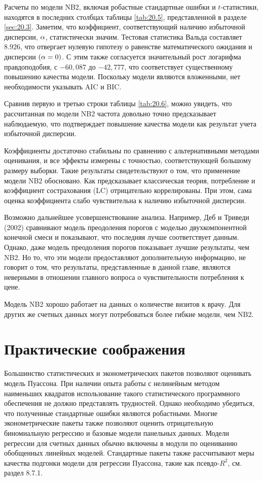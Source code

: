 Расчеты по модели NB2, включая робастные стандартные ошибки и $t$-статистики, находятся в последних столбцах таблицы \ref{tab:20.5}, представленной в разделе \ref{sec:20.3}. Заметим, что коэффициент, соответствующий наличию избыточной дисперсии, $\alpha$, статистически значим.
Тестовая статистика Вальда составляет $8.926$, что отвергает нулевую гипотезу о равенстве математического ожидания и дисперсии $(\alpha = 0)$. С этим также согласуется значительный рост логарифма правдоподобия, с $-60,087$ до $-42,777$, что соответствует существенному повышению качества модели. Поскольку модели являются вложенными, нет необходимости указывать AIC и BIC.

Сравнив первую и третью строки таблицы \ref{tab:20.6}, можно увидеть, что рассчитанная по модели NB2 частота довольно точно предсказывает наблюдаемую, что подтверждает повышение качества модели как результат учета избыточной дисперсии.

Коэффициенты достаточно стабильны по сравнению с альтернативными методами оценивания, и все эффекты измерены с точностью, соответствующей большому размеру выборки. Такие результаты свидетельствуют о том, что применение модели NB2 обосновано. Как предсказывает классическая теория, потребление и коэффициент сострахования (LC) отрицательно коррелированы. При этом, сама оценка коэффициента слабо чувствительна к наличию избыточной дисперсии.

Возможно дальнейшее усовершенствование анализа. Например, Деб и Триведи (2002) сравнивают модель преодоления порогов с моделью двухкомпонентной конечной смеси и показывают, что последняя лучше соответствует данным. Однако, даже модель преодоления порогов показывает лучшие результаты, чем NB2. Но то, что эти модели предоставляют дополнительную информацию, не говорит о том, что результаты, представленные в данной главе, являются неверными в отношении главного вопроса о чувствительности потребления к цене.

Модель NB2 хорошо работает на данных о количестве визитов к врачу. Для других же счетных данных могут потребоваться более гибкие модели, чем NB2.




\section{Практические соображения}\label{sec:20.8}

\noindent
Большинство статистических и эконометрических пакетов позволяют оценивать модель Пуассона. При наличии опыта работы с нелинейным методом наименьших квадратов использование такого статистического программного обеспечения не должно представлять трудностей. Однако необходимо убедиться, что полученные стандартные ошибки являются робастными. Многие эконометрические пакеты также позволяют оценить отрицательную биномиальную регрессию и базовые модели панельных данных. Модели регрессии для счетных данных обычно включены в модули по оцениванию обобщенных линейных моделей. Стандартные пакеты также рассчитывают меры качества подгонки модели для регрессии Пуассона, такие как псевдо-$R^2$, см. раздел 8.7.1.


